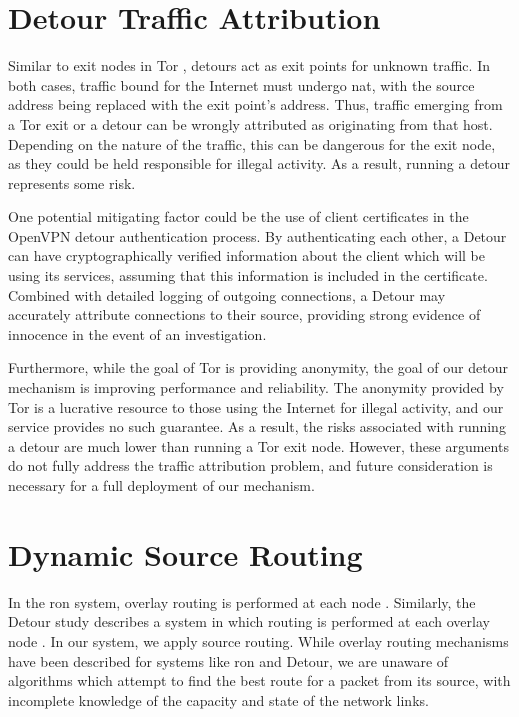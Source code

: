 \documentclass{cwru}
\begin{document}
\section{Detour Traffic Attribution}

Similar to exit nodes in Tor \cite{tor}, detours act as exit points for unknown
traffic. In both cases, traffic bound for the Internet must undergo \ac{nat},
with the source address being replaced with the exit point's address. Thus,
traffic emerging from a Tor exit or a detour can be wrongly attributed as
originating from that host. Depending on the nature of the traffic, this can be
dangerous for the exit node, as they could be held responsible for illegal
activity. As a result, running a detour represents some risk.

One potential mitigating factor could be the use of client certificates in the
OpenVPN detour authentication process. By authenticating each other, a Detour
can have cryptographically verified information about the client which will be
using its services, assuming that this information is included in the
certificate. Combined with detailed logging of outgoing connections, a Detour
may accurately attribute connections to their source, providing strong evidence
of innocence in the event of an investigation.

Furthermore, while the goal of Tor is providing anonymity, the goal of our
detour mechanism is improving performance and reliability. The anonymity
provided by Tor is a lucrative resource to those using the Internet for illegal
activity, and our service provides no such guarantee. As a result, the risks
associated with running a detour are much lower than running a Tor exit node.
However, these arguments do not fully address the traffic attribution problem,
and future consideration is necessary for a full deployment of our mechanism.

\section{Dynamic Source Routing}

In the \ac{ron} system, overlay routing is performed at each node \cite{ron}.
Similarly, the Detour study describes a system in which routing is performed at
each overlay node \cite{detour}. In our system, we apply source routing. While
overlay routing mechanisms have been described for systems like \ac{ron} and
Detour, we are unaware of algorithms which attempt to find the best route for a
packet from its source, with incomplete knowledge of the capacity and state of
the network links.
\end{document}
